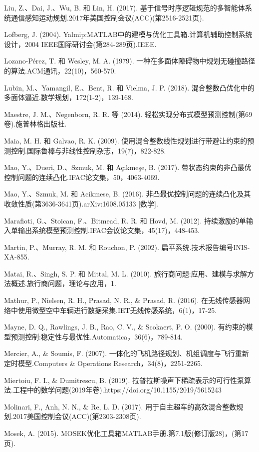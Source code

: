 \documentclass[10pt]{article}
\begin{document}
Liu, Z.、Dai, J.、Wu, B. 和 Lin, H. (2017). 基于信号时序逻辑规范的多智能体系统通信感知运动规划.2017年美国控制会议(ACC)(第2516-2521页).

Lofberg, J. (2004). Yalmip:MATLAB中的建模与优化工具箱.计算机辅助控制系统设计，2004 IEEE国际研讨会(第284-289页).IEEE.

Lozano-Pérez, T. 和 Wesley, M. A. (1979). 一种在多面体障碍物中规划无碰撞路径的算法.ACM通讯，22(10)，560-570.

Lubin, M.、Yamangil, E.、Bent, R. 和 Vielma, J. P. (2018). 混合整数凸优化中的多面体逼近.数学规划，172(1-2)，139-168.

Maestre, J. M.、Negenborn, R. R. 等 (2014). 轻松实现分布式模型预测控制(第69卷).施普林格出版社.

Maia, M. H. 和 Galvao, R. K. (2009). 使用混合整数线性规划进行带避让约束的预测控制.国际鲁棒与非线性控制杂志，19(7)，822-828.

Mao, Y.、Dueri, D.、Szmuk, M. 和 Açıkmeşe, B. (2017). 带状态约束的非凸最优控制问题的连续凸化.IFAC论文集，50，4063-4069.

Mao, Y.、Szmuk, M. 和 Acikmese, B. (2016). 非凸最优控制问题的连续凸化及其收敛性质(第3636-3641页).arXiv:1608.05133 [数学].

Marafioti, G.、Stoican, F.、Bitmead, R. R. 和 Hovd, M. (2012). 持续激励的单输入单输出系统模型预测控制.IFAC会议论文集，45(17)，448-453.

Martin, P.、Murray, R. M. 和 Rouchon, P. (2002). 扁平系统.技术报告编号INIS-XA-855.

Matai, R.、Singh, S. P. 和 Mittal, M. L. (2010). 旅行商问题:应用、建模与求解方法概述.旅行商问题，理论与应用，1.

Mathur, P., Nielsen, R. H., Prasad, N. R., \& Prasad, R. (2016). 在无线传感器网络中使用微型空中车辆进行数据采集.IET无线传感系统，6(1)，17-25.

Mayne, D. Q., Rawlings, J. B., Rao, C. V., \& Scokaert, P. O. (2000). 有约束的模型预测控制:稳定性与最优性.Automatica，36(6)，789-814.

Mercier, A., \& Soumis, F. (2007). 一体化的飞机路径规划、机组调度与飞行重新定时模型.Computers \& Operations Research，34(8)，2251-2265.

Miertoiu, F. I., \& Dumitrescu, B. (2019). 拉普拉斯噪声下稀疏表示的可行性泵算法.工程中的数学问题(2019年卷).https://doi.org/10.1155/2019/5615243

Molinari, F., Anh, N. N., \& Re, L. D. (2017). 用于自主超车的高效混合整数规划.2017美国控制会议(ACC)(第2303-2308页).

Mosek, A. (2015). MOSEK优化工具箱MATLAB手册.第7.1版(修订版28)，(第17页).
\end{document}

